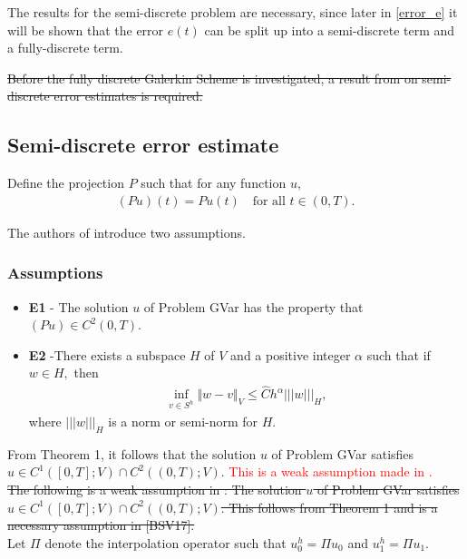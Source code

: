 \documentclass[../../main.tex]{subfiles}
\begin{document}
The results for the semi-discrete problem are necessary, since later in \eqref{error_e} it will be shown that the error $e(t)$ can be split up into a semi-discrete term and a fully-discrete term.

\sout{Before the fully discrete Galerkin Scheme is investigated, a result from \cite{BV13} on semi-discrete error estimates is required.}\\
\subsection{Semi-discrete error estimate}

Define the projection $P$ such that for any function $u$, 
\begin{eqnarray*}
	(Pu)(t) = Pu(t) \ \ \ \textrm{ for all } t \in (0,T).
\end{eqnarray*}

The authors of \cite{BV13} introduce two assumptions.
\subsubsection*{Assumptions} 
\begin{itemize}
	\item[] \textbf{E1} - The solution $u$ of Problem GVar has the property that $(Pu) \in C^2(0,T)$.
	
	\item[] \textbf{E2} -There exists a subspace $H$ of $V$ and a positive integer $\alpha$ such that if $w\in H,$ then
	\begin{eqnarray*}
		\inf_{v\in S^{h}}\Vert w-v\Vert_{V}\leq\hat{C}h^{\alpha}|||w|||_{H},
	\end{eqnarray*}
	where $|||w|||_{H}$ is a norm or semi-norm for $H.$
\end{itemize}

From Theorem 1, it follows that the solution $u$ of Problem GVar satisfies $u \in C^1([0,T]; V) \cap C^2((0,T);V)$. \textcolor{red}{This is a weak assumption made in \cite{BV13}.}\\

\sout{The following is a weak assumption in \cite{BV13}: The solution $u$ of Problem GVar satisfies $u \in C^1([0,T]; V) \cap C^2((0,T);V)$. This follows from Theorem 1 and is a necessary assumption in [BSV17].}\\

Let $\Pi$ denote the interpolation operator such that $u_0^h = \Pi u_0$ and $u_1^h = \Pi u_1$. 
\end{document}
